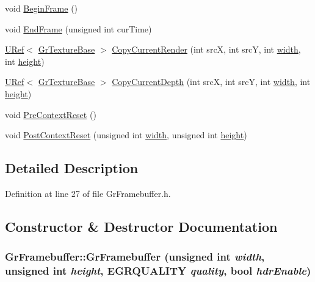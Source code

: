 \begin{CompactItemize}
\item 
void \hyperlink{class_gr_framebuffer_b5ef7902c9a6db344d3be04c5747a007}{BeginFrame} ()
\item 
void \hyperlink{class_gr_framebuffer_1e9e6b3669a0b5d3e07c92ba5290a8ec}{EndFrame} (unsigned int curTime)
\item 
\hyperlink{class_u_ref}{URef}$<$ \hyperlink{class_gr_texture_base}{GrTextureBase} $>$ \hyperlink{class_gr_framebuffer_c262b0f70df5aa7c47313b46894ffa7e}{CopyCurrentRender} (int srcX, int srcY, int \hyperlink{wglext_8h_e6531b1788ca42a9ae8155b0c52e7630}{width}, int \hyperlink{wglext_8h_b2e63df950c3789599e1e43f477bc9e3}{height})
\item 
\hyperlink{class_u_ref}{URef}$<$ \hyperlink{class_gr_texture_base}{GrTextureBase} $>$ \hyperlink{class_gr_framebuffer_ba49556b67bae1454a162bc6c1df7bd3}{CopyCurrentDepth} (int srcX, int srcY, int \hyperlink{wglext_8h_e6531b1788ca42a9ae8155b0c52e7630}{width}, int \hyperlink{wglext_8h_b2e63df950c3789599e1e43f477bc9e3}{height})
\item 
void \hyperlink{class_gr_framebuffer_0c735a474f9888324ca016596d5a8a85}{PreContextReset} ()
\item 
void \hyperlink{class_gr_framebuffer_12d434b383528bee386ad8b08ddc8c0a}{PostContextReset} (unsigned int \hyperlink{wglext_8h_e6531b1788ca42a9ae8155b0c52e7630}{width}, unsigned int \hyperlink{wglext_8h_b2e63df950c3789599e1e43f477bc9e3}{height})
\end{CompactItemize}


\subsection{Detailed Description}


Definition at line 27 of file GrFramebuffer.h.

\subsection{Constructor \& Destructor Documentation}
\hypertarget{class_gr_framebuffer_0433e1f6eb5632194138e0ce4749d9f0}{
\subsubsection[{GrFramebuffer}]{\setlength{\rightskip}{0pt plus 5cm}GrFramebuffer::GrFramebuffer (unsigned int {\em width}, \/  unsigned int {\em height}, \/  {\bf EGRQUALITY} {\em quality}, \/  bool {\em hdrEnable})}}
\label{class_gr_framebuffer_0433e1f6eb5632194138e0ce4749d9f0}




